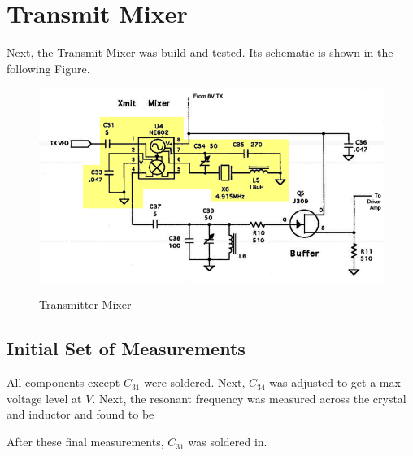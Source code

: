 \section{Transmit Mixer}

Next, the Transmit Mixer was build and tested. Its schematic is shown in the
following Figure. 

\begin{figure}[h!]
  \centering
  \includegraphics[scale=0.65]{./img/txmix.png}
\label{txmix}
\caption{Transmitter Mixer}
\end{figure}

\subsection{Initial Set of Measurements}

All components except $C_{31}$ were soldered. Next, $C_{34}$ was adjusted to get a
max voltage level at $\boxed{ V}$.
Next, the resonant frequency was measured across the crystal and inductor and
found to be $\boxed{ }$


After these final measurements, $C_{31}$ was soldered in.
